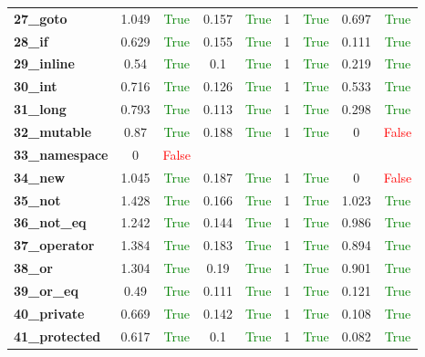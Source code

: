 \documentclass{article}
\begin{document}
\begin{xltabular}{\textwidth}{lcccccccc}
\textbf{27\_goto}& 1.049&\textcolor{green}{True}& 0.157&\textcolor{green}{True}& 1&\textcolor{green}{True}& 0.697&\textcolor{green}{True} \\[0.5ex]
\textbf{28\_if}& 0.629&\textcolor{green}{True}& 0.155&\textcolor{green}{True}& 1&\textcolor{green}{True}& 0.111&\textcolor{green}{True} \\[0.5ex]
\textbf{29\_inline}& 0.54&\textcolor{green}{True}& 0.1&\textcolor{green}{True}& 1&\textcolor{green}{True}& 0.219&\textcolor{green}{True} \\[0.5ex]
\textbf{30\_int}& 0.716&\textcolor{green}{True}& 0.126&\textcolor{green}{True}& 1&\textcolor{green}{True}& 0.533&\textcolor{green}{True} \\[0.5ex]
\textbf{31\_long}& 0.793&\textcolor{green}{True}& 0.113&\textcolor{green}{True}& 1&\textcolor{green}{True}& 0.298&\textcolor{green}{True} \\[0.5ex]
\textbf{32\_mutable}& 0.87&\textcolor{green}{True}& 0.188&\textcolor{green}{True}& 1&\textcolor{green}{True}& 0&\textcolor{red}{False} \\[0.5ex]
\textbf{33\_namespace}& 0&\textcolor{red}{False} \\[0.5ex]
\textbf{34\_new}& 1.045&\textcolor{green}{True}& 0.187&\textcolor{green}{True}& 1&\textcolor{green}{True}& 0&\textcolor{red}{False} \\[0.5ex]
\textbf{35\_not}& 1.428&\textcolor{green}{True}& 0.166&\textcolor{green}{True}& 1&\textcolor{green}{True}& 1.023&\textcolor{green}{True} \\[0.5ex]
\textbf{36\_not\_eq}& 1.242&\textcolor{green}{True}& 0.144&\textcolor{green}{True}& 1&\textcolor{green}{True}& 0.986&\textcolor{green}{True} \\[0.5ex]
\textbf{37\_operator}& 1.384&\textcolor{green}{True}& 0.183&\textcolor{green}{True}& 1&\textcolor{green}{True}& 0.894&\textcolor{green}{True} \\[0.5ex]
\textbf{38\_or}& 1.304&\textcolor{green}{True}& 0.19&\textcolor{green}{True}& 1&\textcolor{green}{True}& 0.901&\textcolor{green}{True} \\[0.5ex]
\textbf{39\_or\_eq}& 0.49&\textcolor{green}{True}& 0.111&\textcolor{green}{True}& 1&\textcolor{green}{True}& 0.121&\textcolor{green}{True} \\[0.5ex]
\textbf{40\_private}& 0.669&\textcolor{green}{True}& 0.142&\textcolor{green}{True}& 1&\textcolor{green}{True}& 0.108&\textcolor{green}{True} \\[0.5ex]
\textbf{41\_protected}& 0.617&\textcolor{green}{True}& 0.1&\textcolor{green}{True}& 1&\textcolor{green}{True}& 0.082&\textcolor{green}{True} \\[0.5ex]

\end{xltabular}
\end{document}
